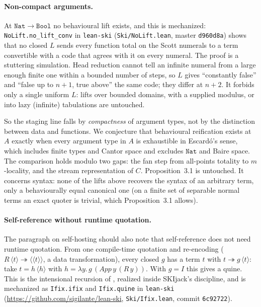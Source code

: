 \paragraph{Non-compact arguments.}  At $\mathtt{Nat} \to \mathtt{Bool}$ no
behavioural lift exists, and this is mechanized: \texttt{NoLift.no\_lift\_conv}
in \texttt{lean-ski} (\texttt{Ski/NoLift.lean}, master \texttt{d960d8a}) shows that no closed $L$ sends
every function total on the Scott numerals to a term convertible with a code
that agrees with it on every numeral.  The proof is a stuttering simulation.
Head reduction cannot tell an infinite numeral from a large enough finite one
within a bounded number of steps, so $L$ gives ``constantly false'' and ``false
up to $n{+}1$, true above'' the same code; they differ at $n{+}2$.  It forbids
only a single uniform $L$: lifts over bounded domains, with a supplied modulus,
or into lazy (infinite) tabulations are untouched.

So the staging line falls by \emph{compactness} of argument types, not by
the distinction between data and functions.  We conjecture that behavioural
reification exists at $A$ exactly when every argument type in $A$ is
exhaustible in Escard\'o's sense, which includes finite types and Cantor
space and excludes $\mathtt{Nat}$ and Baire space.  The comparison holds modulo
two gaps: the fan step from all-points totality to $m$-locality, and the
stream representation of $C$.  Proposition~3.1 is untouched.  It concerns
syntax: none of the lifts above recovers the syntax of an arbitrary term,
only a behaviourally equal canonical one (on a finite set of separable normal
terms an exact quoter is trivial, which Proposition~3.1 allows).

\paragraph{Self-reference without runtime quotation.}  The paragraph on
self-hosting should also note that self-reference does not need runtime
quotation.  From one compile-time quotation and re-encoding ($R\,\langle t
\rangle \twoheadrightarrow \langle\langle t\rangle\rangle$, a data
transformation), every closed $g$ has a term $t$ with $t \twoheadrightarrow
g\,\langle t\rangle$: take $t = h\,\langle h\rangle$ with $h = \lambda y.\,
g\,(\mathit{App}\,y\,(R\,y))$.  With $g = I$ this gives a quine.  This is the
intensional recursion of \citet{Kavvos2017}, realized inside SKIjack's
discipline, and is mechanized as \texttt{Ifix.ifix} and \texttt{Ifix.quine}
in \texttt{lean-ski} (\url{https://github.com/sigilante/lean-ski},
\texttt{Ski/Ifix.lean}, commit \texttt{6c92722}).

